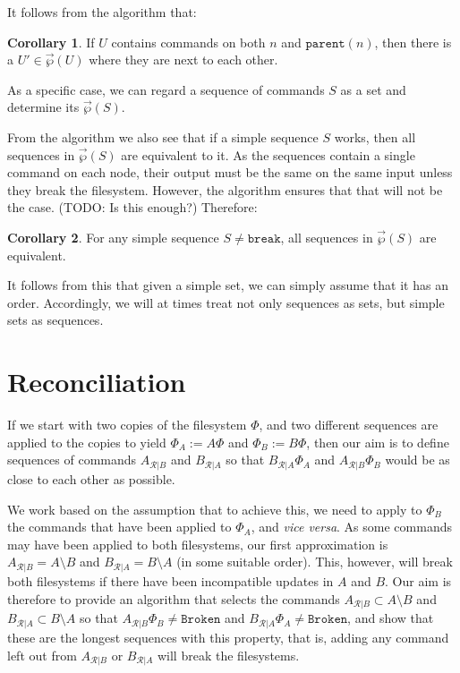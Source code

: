 \documentclass[12pt]{article}
\newcommand{\parent}{\mathtt{parent}}
\newcommand{\fsbroken}{\mathtt{Broken}} %
\newcommand{\FS}{\Phi} %
\newcommand{\cbrk}{\mathtt{break}} %
\newcommand{\orderset}[1]{\vec{\wp}({#1})}
\newcommand{\recchar}[3]{{#1}^{#3}_{\mathcal{R}|{#2}}}
\newcommand{\reca}{\recchar{A}{B}{}} %
\newcommand{\recb}{\recchar{B}{A}{}} %
\theoremstyle{definition}
\newtheorem{mycor}{Corollary}
\begin{document}
It follows from the algorithm that:
\begin{mycor}\label{lemma:neighbor}
If $U$ contains commands on both $n$ and $\parent(n)$, then
there is a $U'\in\orderset{U}$ where they are next to each other.
\end{mycor}

As a specific case, we can regard a sequence of commands $S$
as a set and determine its $\orderset{S}$.

From the algorithm we also see that if a simple sequence $S$ works, then
all sequences in $\orderset{S}$ are equivalent to it.
As the sequences contain a single command on each node,
their output must be the same on the same input unless
they break the filesystem.
However, the algorithm ensures that that will not be the case.
(TODO: Is this enough?)
Therefore:

\begin{mycor}\label{simple_reorder_equiv}
For any simple sequence $S\neq\cbrk$,
all sequences in $\orderset{S}$ are equivalent.
\end{mycor}

It follows from this that given a simple set,
we can simply assume that it has an order.
Accordingly, we will at times treat not only sequences as sets,
but simple sets as sequences.


\section{Reconciliation}

If we start with two copies of the filesystem $\FS$,
and two different sequences are applied to the copies to yield $\FS_A:=A\FS$
and $\FS_B:=B\FS$, then our aim is to define sequences of commands $\reca$ and $\recb$
so that $\recb\FS_A$ and $\reca\FS_B$ would be as close to each other as possible.

We work based on the assumption that to achieve this, we need
to apply to $\FS_B$ the commands that have been applied to $\FS_A$, and \emph{vice versa}.
As some commands may have been applied to both filesystems, our first approximation
is $\reca = A\setminus B$ and $\recb = B\setminus A$
(in some suitable order).
This, however, will break both filesystems if there have been incompatible updates
in $A$ and $B$. 
Our aim is therefore to provide an algorithm that selects the commands 
$\reca \subset A\setminus B$
and $\recb \subset B\setminus A$ 
so that $\reca\FS_B\neq\fsbroken$ and $\recb\FS_A\neq\fsbroken$,
and show that these are the longest sequences with this property, that is,
adding any command left out from $\reca$ or $\recb$ will break the filesystems.
\end{document}
